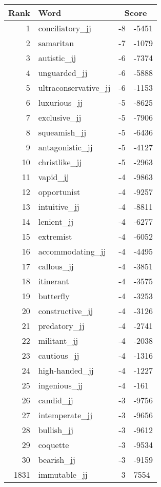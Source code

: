 \begin{longtable}[!htbp]{| rlr@{.}l |}
    \hline
    \textbf{Rank} & \textbf{Word} & \multicolumn{2}{c|}{\textbf{Score}} \\
    \hline
    \endhead
    1 & conciliatory\_jj & -8 & -5451 \\
    2 & samaritan & -7 & -1079 \\
    3 & autistic\_jj & -6 & -7374 \\
    4 & unguarded\_jj & -6 & -5888 \\
    5 & ultraconservative\_jj & -6 & -1153 \\
    6 & luxurious\_jj & -5 & -8625 \\
    7 & exclusive\_jj & -5 & -7906 \\
    8 & squeamish\_jj & -5 & -6436 \\
    9 & antagonistic\_jj & -5 & -4127 \\
    10 & christlike\_jj & -5 & -2963 \\
    11 & vapid\_jj & -4 & -9863 \\
    12 & opportunist & -4 & -9257 \\
    13 & intuitive\_jj & -4 & -8811 \\
    14 & lenient\_jj & -4 & -6277 \\
    15 & extremist & -4 & -6052 \\
    16 & accommodating\_jj & -4 & -4495 \\
    17 & callous\_jj & -4 & -3851 \\
    18 & itinerant & -4 & -3575 \\
    19 & butterfly & -4 & -3253 \\
    20 & constructive\_jj & -4 & -3126 \\
    21 & predatory\_jj & -4 & -2741 \\
    22 & militant\_jj & -4 & -2038 \\
    23 & cautious\_jj & -4 & -1316 \\
    24 & high-handed\_jj & -4 & -1227 \\
    25 & ingenious\_jj & -4 & -161 \\
    26 & candid\_jj & -3 & -9756 \\
    27 & intemperate\_jj & -3 & -9656 \\
    28 & bullish\_jj & -3 & -9612 \\
    29 & coquette & -3 & -9534 \\
    30 & bearish\_jj & -3 & -9159 \\
    1831 & immutable\_jj & 3 & 7554 \\

\end{longtable}
